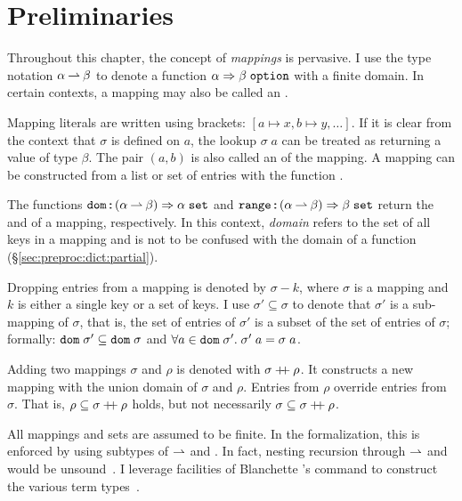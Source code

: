 
\section{Preliminaries}
\label{sec:terms:prelim}

Throughout this chapter, the concept of \emph{mappings} is pervasive.
I use the type notation $\alpha \mathbin{\rightharpoonup} \beta$ to denote a function $\alpha \Rightarrow \beta\;\texttt{\textup{option}}$ with a finite domain.
In certain contexts, a mapping may also be called an .

Mapping literals are written using brackets: $[a \mapsto x, b \mapsto y, \ldots]$.
If it is clear from the context that $\sigma$ is defined on $a$, the lookup $\sigma\;a$ can be treated as returning a value of type $\beta$.
The pair $(a, b)$ is also called an  of the mapping.
A mapping can be constructed from a list or set of entries with the function .

The functions $\texttt{\textup{dom}} \mathbin{:\!\!:} (\alpha \mathbin{\rightharpoonup} \beta) \Rightarrow \alpha\;\texttt{\textup{set}}$ and $\texttt{\textup{range}} \mathbin{:\!\!:} (\alpha \mathbin{\rightharpoonup} \beta) \Rightarrow \beta\;\texttt{\textup{set}}$ return the  and  of a mapping, respectively.
In this context, \emph{domain} refers to the set of all keys in a mapping and is not to be confused with the domain of a function (§\ref{sec:preproc:dict:partial}).

Dropping entries from a mapping is denoted by $\sigma - k$, where $\sigma$ is a mapping and $k$ is either a single key or a set of keys.
I use $\sigma' \subseteq \sigma$ to denote that $\sigma'$ is a sub-mapping of $\sigma$, that is, the set of entries of $\sigma'$ is a subset of the set of entries of $\sigma$;
formally: $\texttt{\textup{dom}}\;\sigma' \subseteq \texttt{\textup{dom}}\;\sigma$ and $\forall a \in \texttt{\textup{dom}}\;\sigma'.\; \sigma'\;a = \sigma\;a$.

Adding two mappings $\sigma$ and $\rho$ is denoted with $\sigma \mathbin{+\!\!+} \rho$.
It constructs a new mapping with the union domain of $\sigma$ and $\rho$.
Entries from $\rho$ override entries from $\sigma$.
That is, $\rho \subseteq \sigma \mathbin{+\!\!+} \rho$ holds, but not necessarily $\sigma \subseteq \sigma \mathbin{+\!\!+} \rho$.

All mappings and sets are assumed to be finite.
In the formalization, this is enforced by using subtypes of $\mathbin{\rightharpoonup}$ and .%
In fact, nesting recursion through $\mathbin{\rightharpoonup}$ and  would be unsound~\cite{gunter1992datatype,berghofer1999inductive,biendarra2017foundational}.
I leverage facilities of Blanchette \etal's  command to construct the various term types~\cite{blanchette2014datatypes}.

